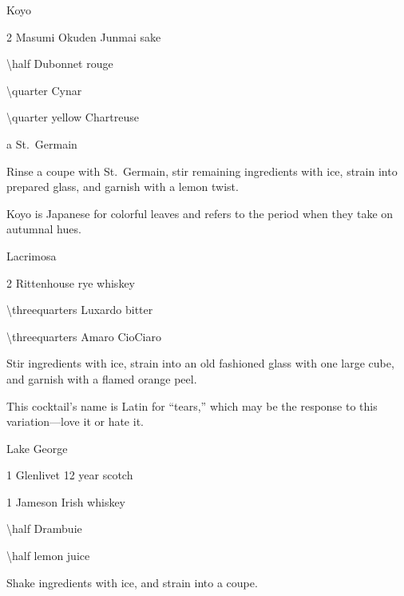 \begin{PDTCocktail}{Koyo}
	\begin{Ingredients}
	\item \SI{2}{\oz} Masumi Okuden Junmai sake
	\item \SI{\half}{\oz} Dubonnet rouge
	\item \SI{\quarter}{\oz} Cynar
	\item \SI{\quarter}{\oz} yellow Chartreuse
	\item a \si{\dash} St.\ Germain
	\end{Ingredients}
	
	\begin{Instructions}
	Rinse a coupe with St.\ Germain, stir remaining ingredients with ice, strain into prepared glass, and garnish with a lemon twist.
	
	Koyo is Japanese for colorful leaves and refers to the period when they take on autumnal hues.
	\end{Instructions}
\end{PDTCocktail}

\begin{PDTCocktail}{Lacrimosa}
	\begin{Ingredients}
	\item \SI{2}{\oz} Rittenhouse rye whiskey
	\item \SI{\threequarters}{\oz} Luxardo bitter
	\item \SI{\threequarters}{\oz} Amaro CioCiaro
	\end{Ingredients}
	
	\begin{Instructions}
	Stir ingredients with ice, strain into an old fashioned glass with one large cube, and garnish with a flamed orange peel.
	
	This cocktail's name is Latin for ``tears,'' which may be the response to this  variation---love it or hate it.
	\end{Instructions}
\end{PDTCocktail}

\begin{PDTCocktail}{Lake George}
	\begin{Ingredients}
	\item \SI{1}{\oz} Glenlivet 12 year scotch
	\item \SI{1}{\oz} Jameson Irish whiskey
	\item \SI{\half}{\oz} Drambuie
	\item \SI{\half}{\oz} lemon juice
	\end{Ingredients}
	
	\begin{Instructions}
	Shake ingredients with ice, and strain into a coupe.
	\end{Instructions}
\end{PDTCocktail}


